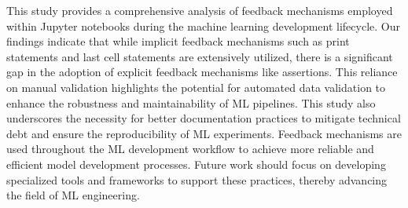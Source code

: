 \documentclass[journal]{IEEEtran}       %
\begin{document}
This study provides a comprehensive analysis of feedback mechanisms
employed within Jupyter notebooks during the machine learning
development lifecycle. Our findings indicate that while implicit
feedback mechanisms such as print statements and last cell statements
are extensively utilized, there is a significant gap in the adoption
of explicit feedback mechanisms like assertions. This reliance on
manual validation highlights the potential for automated data
validation to enhance the robustness and maintainability of ML
pipelines. This study also underscores the necessity for better
documentation practices to mitigate technical debt and ensure the
reproducibility of ML experiments. Feedback mechanisms are used
throughout the ML development workflow to achieve more reliable and
efficient model development processes. Future work should focus on
developing specialized tools and frameworks to support these
practices, thereby advancing the field of ML engineering.




\end{document}
